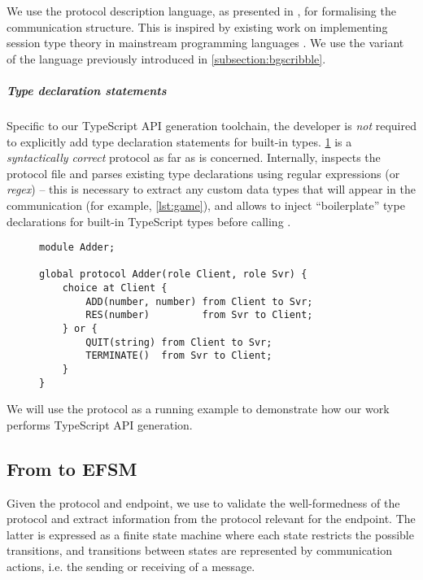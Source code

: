 We use the  protocol description language, 
as presented in
\cite{Scribble}, for formalising the communication structure. This is
inspired by existing work on implementing session type theory 
in mainstream programming languages
\cite{Hybrid2016, PureScript2019, Python2017}. 
We use the variant of the  language 
previously introduced in \cref{subsection:bgscribble}.

\subparagraph{Type declaration statements}
Specific to our TypeScript API generation toolchain,
the developer is \textit{not} required to explicitly
add type declaration statements for built-in types.
\cref{lst:adder} is a \textit{syntactically correct}
 protocol as far as 
 is concerned. 
Internally,  inspects the protocol file
and parses existing type declarations using regular expressions
(or \textit{regex}) -- this is necessary to extract any
custom data types that will appear in the communication (for example,
\cref{lst:game}), and allows  to inject
``boilerplate'' type declarations for built-in TypeScript types before
calling .

\begin{figure}[!ht]
\begin{lstlisting}[language=Scribble]
module Adder;

global protocol Adder(role Client, role Svr) {
	choice at Client {
		ADD(number, number) from Client to Svr;
		RES(number)         from Svr to Client;	
	} or {
		QUIT(string) from Client to Svr;	
		TERMINATE()  from Svr to Client;
	}
}
\end{lstlisting}
\label{lst:adder}
\end{figure}

We will use the  protocol as a running example
to demonstrate how our work performs TypeScript API generation.

\subsection{From  to EFSM}
\label{subsection:efsm}

Given the protocol and endpoint, we use 
to validate the well-formedness of the protocol and extract
information from the protocol relevant for the endpoint.
The latter is expressed as a finite state machine
where each state restricts the possible transitions, 
and transitions between states are represented by
communication actions, i.e. the sending or receiving of a message.

